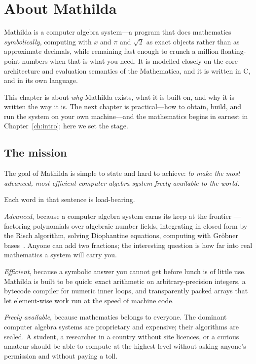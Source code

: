 \chapter{About Mathilda}
\label{ch:about}

%
Mathilda is a computer algebra system---a program that does mathematics
\emph{symbolically}, computing with $x$ and $\pi$ and $\sqrt{2}$ as exact objects
rather than as approximate decimals, while remaining fast enough to crunch a
million floating-point numbers when that is what you need. It is modelled closely
on the core architecture and evaluation semantics of the Mathematica, and it
is written in C, and in its own language.

This chapter is about \emph{why} Mathilda exists, what it is built on, and why it
is written the way it is. The next chapter is practical---how to obtain, build, and
run the system on your own machine---and the mathematics begins in earnest in
Chapter~\ref{ch:intro}; here we set the stage.

\section{The mission}
\label{sec:mission}

The goal of Mathilda is simple to state and hard to achieve: \emph{to make the
most advanced, most efficient computer algebra system freely available to the
world.}

Each word in that sentence is load-bearing.

\emph{Advanced}, because a computer algebra system earns its keep at the frontier
---factoring polynomials over algebraic number fields, integrating in closed form
by the Risch algorithm, solving Diophantine equations, computing with Gr\"obner
bases~\cite{gcl}. Anyone can add two fractions; the interesting question is how far
into real mathematics a system will carry you.

\emph{Efficient}, because a symbolic answer you cannot get before lunch is of
little use. Mathilda is built to be quick: exact arithmetic on arbitrary-precision
integers, a bytecode compiler for numeric inner loops, and transparently packed
arrays that let element-wise work run at the speed of machine code.

\emph{Freely available}, because mathematics belongs to everyone. The dominant
computer algebra systems are proprietary and expensive; their algorithms are
sealed. A student, a researcher in a country without site licences, or a curious
amateur should be able to compute at the highest level without asking anyone's
permission and without paying a toll.

